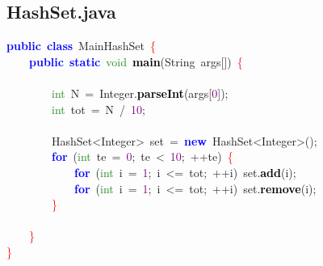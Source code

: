 \subsection{HashSet.java}
\noindent
\mbox{}\textbf{\textcolor{Blue}{public}}\ \textbf{\textcolor{Blue}{class}}\ \textcolor{TealBlue}{MainHashSet}\ \textcolor{Red}{\{} \\
\mbox{}\ \ \ \ \textbf{\textcolor{Blue}{public}}\ \textbf{\textcolor{Blue}{static}}\ \textcolor{ForestGreen}{void}\ \textbf{\textcolor{Black}{main}}\textcolor{BrickRed}{(}\textcolor{TealBlue}{String}\ args\textcolor{BrickRed}{[])}\ \textcolor{Red}{\{} \\
\mbox{}\ \ \ \ \ \ \ \  \\
\mbox{}\ \ \ \ \ \ \ \ \textcolor{ForestGreen}{int}\ N\ \textcolor{BrickRed}{=}\ Integer\textcolor{BrickRed}{.}\textbf{\textcolor{Black}{parseInt}}\textcolor{BrickRed}{(}args\textcolor{BrickRed}{[}\textcolor{Purple}{0}\textcolor{BrickRed}{]);} \\
\mbox{}\ \ \ \ \ \ \ \ \textcolor{ForestGreen}{int}\ tot\ \textcolor{BrickRed}{=}\ N\ \textcolor{BrickRed}{/}\ \textcolor{Purple}{10}\textcolor{BrickRed}{;} \\
\mbox{} \\
\mbox{}\ \ \ \ \ \ \ \ \textcolor{TealBlue}{HashSet\textless{}Integer\textgreater{}}\ set\ \textcolor{BrickRed}{=}\ \textbf{\textcolor{Blue}{new}}\ HashSet\textcolor{BrickRed}{\textless{}}Integer\textcolor{BrickRed}{\textgreater{}();} \\
\mbox{}\ \ \ \ \ \ \ \ \textbf{\textcolor{Blue}{for}}\ \textcolor{BrickRed}{(}\textcolor{ForestGreen}{int}\ te\ \textcolor{BrickRed}{=}\ \textcolor{Purple}{0}\textcolor{BrickRed}{;}\ te\ \textcolor{BrickRed}{\textless{}}\ \textcolor{Purple}{10}\textcolor{BrickRed}{;}\ \textcolor{BrickRed}{++}te\textcolor{BrickRed}{)}\ \textcolor{Red}{\{} \\
\mbox{}\ \ \ \ \ \ \ \ \ \ \ \ \textbf{\textcolor{Blue}{for}}\ \textcolor{BrickRed}{(}\textcolor{ForestGreen}{int}\ i\ \textcolor{BrickRed}{=}\ \textcolor{Purple}{1}\textcolor{BrickRed}{;}\ i\ \textcolor{BrickRed}{\textless{}=}\ tot\textcolor{BrickRed}{;}\ \textcolor{BrickRed}{++}i\textcolor{BrickRed}{)}\ set\textcolor{BrickRed}{.}\textbf{\textcolor{Black}{add}}\textcolor{BrickRed}{(}i\textcolor{BrickRed}{);} \\
\mbox{}\ \ \ \ \ \ \ \ \ \ \ \ \textbf{\textcolor{Blue}{for}}\ \textcolor{BrickRed}{(}\textcolor{ForestGreen}{int}\ i\ \textcolor{BrickRed}{=}\ \textcolor{Purple}{1}\textcolor{BrickRed}{;}\ i\ \textcolor{BrickRed}{\textless{}=}\ tot\textcolor{BrickRed}{;}\ \textcolor{BrickRed}{++}i\textcolor{BrickRed}{)}\ set\textcolor{BrickRed}{.}\textbf{\textcolor{Black}{remove}}\textcolor{BrickRed}{(}i\textcolor{BrickRed}{);} \\
\mbox{}\ \ \ \ \ \ \ \ \textcolor{Red}{\}} \\
\mbox{} \\
\mbox{}\ \ \ \ \textcolor{Red}{\}} \\
\mbox{}\textcolor{Red}{\}} \\
\mbox{}

